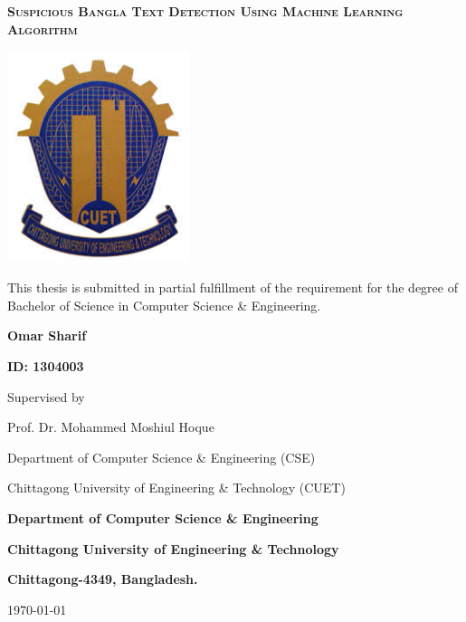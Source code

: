 \begin{titlepage}
	\centering
	{\scshape\Large\bfseries Suspicious Bangla Text Detection Using Machine Learning Algorithm \par}
	\vspace{1cm}
	\includegraphics[width=0.4\textwidth]{Figures/Logo.jpeg}\par\vspace{1cm}
	\vspace{1cm}
	 This thesis is submitted in partial fulfillment of the requirement for the degree of Bachelor of Science in Computer Science \& Engineering.
	
	\vspace{2cm}
	\textbf{Omar Sharif}\par 
	\vspace{.5cm}
	\textbf{ID: 1304003}\par 
	
	\vspace{2cm}
	Supervised by\par 
	Prof. Dr. Mohammed Moshiul Hoque\par 
	Department of Computer Science \& Engineering (CSE)\par 
	Chittagong University of Engineering \& Technology (CUET)
	
	\vspace{1.5cm}
	{\Large\bfseries Department of Computer Science \& Engineering\par}
	{\large\bfseries Chittagong University of Engineering \& Technology\par}
	{\bfseries Chittagong-4349, Bangladesh.}

	\vfill
	{\large \today\par}
\end{titlepage}

\setcounter{secnumdepth}{-1}

